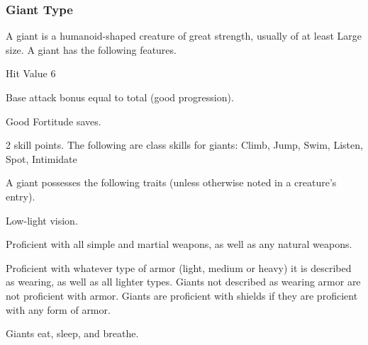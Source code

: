 {\subsubsection{Giant Type} A giant is a humanoid-shaped creature of great strength, usually of at least Large size.
 A giant has the following features.
\begin{itemize*}
\item Hit Value 6
\item Base attack bonus equal to total  (good progression).
\item Good Fortitude saves.
\item 2 skill points. The following are class skills for giants: Climb, Jump, Swim, Listen, Spot, Intimidate
\end{itemize*}
 A giant possesses the following traits (unless otherwise noted in a creature's entry).
\begin{itemize*}
\item Low-light vision.
\item Proficient with all simple and martial weapons, as well as any natural weapons.
\item Proficient with whatever type of armor (light, medium or heavy) it is described as wearing, as well as all lighter types. Giants not described as wearing armor are not proficient with armor. Giants are proficient with shields if they are proficient with any form of armor.
\item Giants eat, sleep, and breathe.
\end{itemize*}

}
